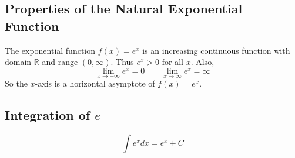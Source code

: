 \subsection*{Properties of the Natural Exponential Function}

The exponential function \( f(x)=e^x \) is an increasing continuous function with domain \( \mathbb{R} \) and range \( (0, \infty) \). Thus \( e^x > 0 \) for all \(x\). Also, 
\[ \lim_{x \to -\infty}{e^x} = 0 \quad \quad \lim_{x \to \infty}{e^x} = \infty \]
So the \(x\)-axis is a horizontal asymptote of \(f(x)=e^x\).

\subsection*{Integration of \( e \)}

\[ \int{e^x dx} = e^x + C \]
